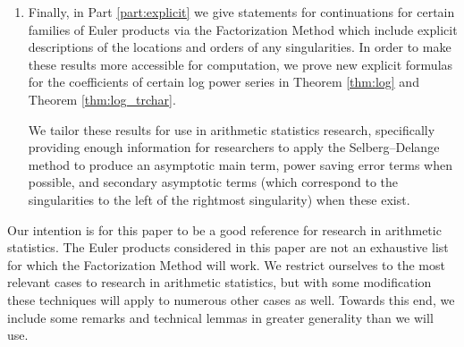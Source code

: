 \documentclass[12pt]{amsart}
\theoremstyle{plain}
\begin{document}
\begin{enumerate}[1)]
    \item Finally, in Part \ref{part:explicit} we give statements for continuations for certain families of Euler products via the Factorization Method which include explicit descriptions of the locations and orders of any singularities. In order to make these results more accessible for computation, we prove new explicit formulas for the coefficients of certain log power series in Theorem \ref{thm:log} and Theorem \ref{thm:log_trchar}.
    
    We tailor these results for use in arithmetic statistics research, specifically providing enough information for researchers to apply the Selberg--Delange method to produce an asymptotic main term, power saving error terms when possible, and secondary asymptotic terms (which correspond to the singularities to the left of the rightmost singularity) when these exist.
\end{enumerate}

Our intention is for this paper to be a good reference for research in arithmetic statistics. The Euler products considered in this paper are not an exhaustive list for which the Factorization Method will work. We restrict ourselves to the most relevant cases to research in arithmetic statistics, but with some modification these techniques will apply to numerous other cases as well. Towards this end, we include some remarks and technical lemmas in greater generality than we will use.
\end{document}
